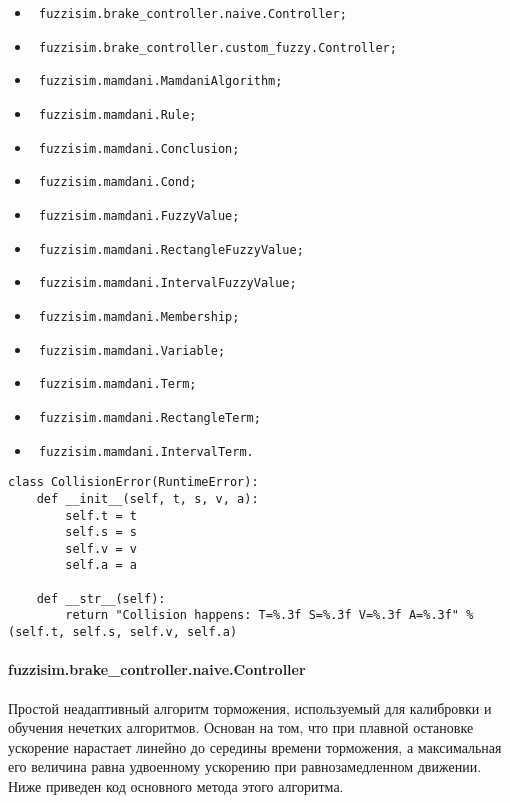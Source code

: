 \begin{itemize}
	\item \lstinline! fuzzisim.brake_controller.naive.Controller;!
	\item \lstinline! fuzzisim.brake_controller.custom_fuzzy.Controller;!
	\item \lstinline! fuzzisim.mamdani.MamdaniAlgorithm;!
	\item \lstinline! fuzzisim.mamdani.Rule;!
	\item \lstinline! fuzzisim.mamdani.Conclusion;!
	\item \lstinline! fuzzisim.mamdani.Cond;!
	\item \lstinline! fuzzisim.mamdani.FuzzyValue;!
	\item \lstinline! fuzzisim.mamdani.RectangleFuzzyValue;!
	\item \lstinline! fuzzisim.mamdani.IntervalFuzzyValue;!
	\item \lstinline! fuzzisim.mamdani.Membership;!
	\item \lstinline! fuzzisim.mamdani.Variable;!
	\item \lstinline! fuzzisim.mamdani.Term;!
	\item \lstinline! fuzzisim.mamdani.RectangleTerm;!
	\item \lstinline! fuzzisim.mamdani.IntervalTerm.!
\end{itemize}

\begin{lstlisting}[style=pythonstyle,caption={  }, label=lst:func:1]
class CollisionError(RuntimeError):
	def __init__(self, t, s, v, a):
		self.t = t
		self.s = s
		self.v = v
		self.a = a

	def __str__(self):
		return "Collision happens: T=%.3f S=%.3f V=%.3f A=%.3f" % (self.t, self.s, self.v, self.a)
\end{lstlisting}



\paragraph{fuzzisim.brake\_controller.naive.Controller}

Простой неадаптивный алгоритм торможения, используемый для калибровки и обучения нечетких алгоритмов. Основан на том, что при плавной остановке ускорение нарастает линейно до середины времени торможения, а максимальная его величина равна удвоенному ускорению при равнозамедленном движении. Ниже приведен код основного метода этого алгоритма.


